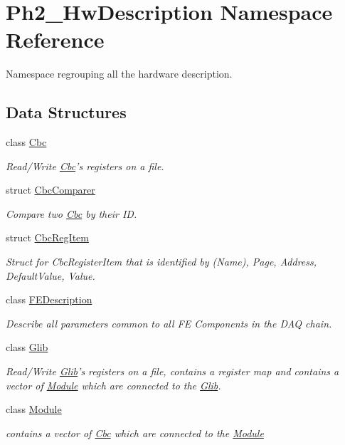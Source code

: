 \hypertarget{namespace_ph2___hw_description}{\section{Ph2\-\_\-\-Hw\-Description Namespace Reference}
\label{namespace_ph2___hw_description}
}


Namespace regrouping all the hardware description.  


\subsection*{Data Structures}
\begin{DoxyCompactItemize}
\item 
class \hyperlink{class_ph2___hw_description_1_1_cbc}{Cbc}
\begin{DoxyCompactList}\small\item\em Read/\-Write \hyperlink{class_ph2___hw_description_1_1_cbc}{Cbc}'s registers on a file. \end{DoxyCompactList}\item 
struct \hyperlink{struct_ph2___hw_description_1_1_cbc_comparer}{Cbc\-Comparer}
\begin{DoxyCompactList}\small\item\em Compare two \hyperlink{class_ph2___hw_description_1_1_cbc}{Cbc} by their I\-D. \end{DoxyCompactList}\item 
struct \hyperlink{struct_ph2___hw_description_1_1_cbc_reg_item}{Cbc\-Reg\-Item}
\begin{DoxyCompactList}\small\item\em Struct for Cbc\-Register\-Item that is identified by (Name), Page, Address, Default\-Value, Value. \end{DoxyCompactList}\item 
class \hyperlink{class_ph2___hw_description_1_1_f_e_description}{F\-E\-Description}
\begin{DoxyCompactList}\small\item\em Describe all parameters common to all F\-E Components in the D\-A\-Q chain. \end{DoxyCompactList}\item 
class \hyperlink{class_ph2___hw_description_1_1_glib}{Glib}
\begin{DoxyCompactList}\small\item\em Read/\-Write \hyperlink{class_ph2___hw_description_1_1_glib}{Glib}'s registers on a file, contains a register map and contains a vector of \hyperlink{class_ph2___hw_description_1_1_module}{Module} which are connected to the \hyperlink{class_ph2___hw_description_1_1_glib}{Glib}. \end{DoxyCompactList}\item 
class \hyperlink{class_ph2___hw_description_1_1_module}{Module}
\begin{DoxyCompactList}\small\item\em contains a vector of \hyperlink{class_ph2___hw_description_1_1_cbc}{Cbc} which are connected to the \hyperlink{class_ph2___hw_description_1_1_module}{Module} \end{DoxyCompactList}\end{DoxyCompactItemize}
